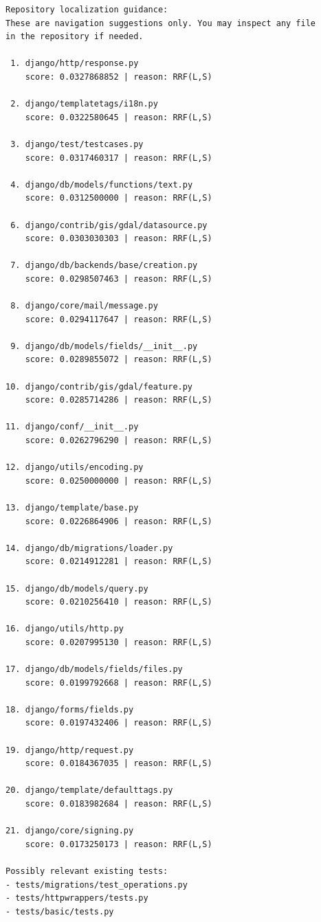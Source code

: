 \begingroup
\small
\begin{verbatim}
Repository localization guidance:
These are navigation suggestions only. You may inspect any file
in the repository if needed.

 1. django/http/response.py
    score: 0.0327868852 | reason: RRF(L,S)

 2. django/templatetags/i18n.py
    score: 0.0322580645 | reason: RRF(L,S)

 3. django/test/testcases.py
    score: 0.0317460317 | reason: RRF(L,S)

 4. django/db/models/functions/text.py
    score: 0.0312500000 | reason: RRF(L,S)

 6. django/contrib/gis/gdal/datasource.py
    score: 0.0303030303 | reason: RRF(L,S)

 7. django/db/backends/base/creation.py
    score: 0.0298507463 | reason: RRF(L,S)

 8. django/core/mail/message.py
    score: 0.0294117647 | reason: RRF(L,S)

 9. django/db/models/fields/__init__.py
    score: 0.0289855072 | reason: RRF(L,S)

10. django/contrib/gis/gdal/feature.py
    score: 0.0285714286 | reason: RRF(L,S)

11. django/conf/__init__.py
    score: 0.0262796290 | reason: RRF(L,S)

12. django/utils/encoding.py
    score: 0.0250000000 | reason: RRF(L,S)

13. django/template/base.py
    score: 0.0226864906 | reason: RRF(L,S)

14. django/db/migrations/loader.py
    score: 0.0214912281 | reason: RRF(L,S)

15. django/db/models/query.py
    score: 0.0210256410 | reason: RRF(L,S)

16. django/utils/http.py
    score: 0.0207995130 | reason: RRF(L,S)

17. django/db/models/fields/files.py
    score: 0.0199792668 | reason: RRF(L,S)

18. django/forms/fields.py
    score: 0.0197432406 | reason: RRF(L,S)

19. django/http/request.py
    score: 0.0184367035 | reason: RRF(L,S)

20. django/template/defaulttags.py
    score: 0.0183982684 | reason: RRF(L,S)

21. django/core/signing.py
    score: 0.0173250173 | reason: RRF(L,S)

Possibly relevant existing tests:
- tests/migrations/test_operations.py
- tests/httpwrappers/tests.py
- tests/basic/tests.py
\end{verbatim}
\endgroup

